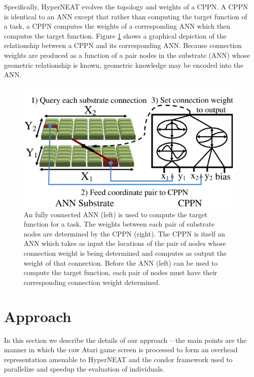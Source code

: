 \documentclass{article}
\begin{document}
Specifically, HyperNEAT evolves the topology and weights of a CPPN. A CPPN is identical to an ANN except that rather than computing the target function of a task, a CPPN computes the weights of a corresponding ANN which then computes the target function. Figure \ref{fig:cppn} shows a graphical depiction of the relationship between a CPPN and its corresponding ANN. Because connection weights are produced as a function of a pair nodes in the substrate (ANN) whose geometric relationship is known, geometric knowledge may be encoded into the ANN. 

\begin{figure}[htp]
\begin{center}
\includegraphics[scale=.3]{figures/cppn.png}
\end{center}
\caption{An fully connected ANN (left) is used to compute the target function for a task. The weights between each pair of substrate nodes are determined by the CPPN (right). The CPPN is itself an ANN which takes as input the locations of the pair of nodes whose connection weight is being determined and computes as output the weight of that connection. Before the ANN (left) can be used to compute the target function, each pair of nodes must have their corresponding connection weight determined.}
\label{fig:cppn}
\end{figure}

\section{Approach}

In this section we describe the details of our approach -- the main points are the manner in which the raw Atari game screen is processed to form an overhead representation amenable to HyperNEAT and the condor framework used to parallelize and speedup the evaluation of individuals.
\end{document}
